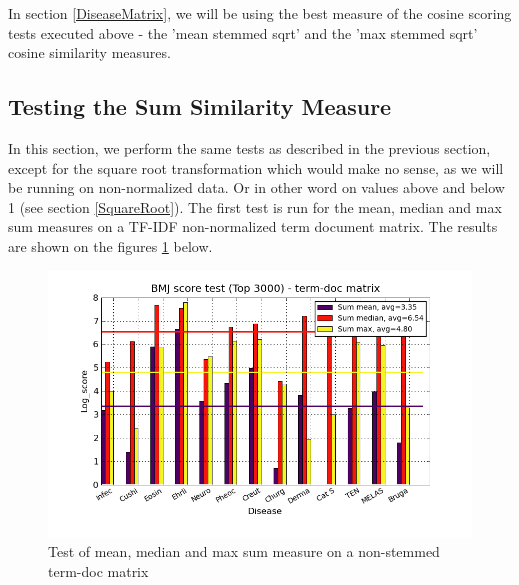 In section \ref{DiseaseMatrix}, we will be using the best measure of the cosine scoring tests 
executed above - the 'mean stemmed sqrt' and the 'max stemmed sqrt' cosine similarity measures.

\subsection{Testing the Sum Similarity Measure\label{TestingSumSimilarity}}

In this section, we perform the same tests as described in the
previous section, except for the square root transformation which
would make no sense, as we will be running on non-normalized data. Or in
other word on values above and below 1 (see section
\ref{SquareRoot}). The first test is run for the mean, median and max
sum measures on a TF-IDF non-normalized term document matrix. The
results are shown on the figures
\ref{termDoc_bmj_hist_3000_sum_mea_med_max} below.

\begin{figure}[H]
  \caption{Test of mean, median and max sum measure on a non-stemmed term-doc matrix}
  \begin{center}
    \includegraphics[width=1.2\textwidth]{barcharts/termDoc_bmj_hist_3000_sum_mea_med_max.png}
  \end{center}
  \label{termDoc_bmj_hist_3000_sum_mea_med_max}
\end{figure}


